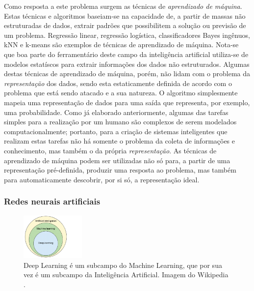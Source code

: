 \documentclass[12pt, a4paper]{article}
\begin{document}
Como resposta a este problema surgem as técnicas de \emph{aprendizado de máquina}. Estas técnicas e algoritmos
baseiam-se na capacidade de, a partir de massas não estruturadas de dados, extrair padrões que
possibilitem a solução ou previsão de um problema.
Regressão linear, regressão logística, classificadores Bayes ingênuos, 
kNN e k-means são exemplos de técnicas de aprendizado de máquina.
Nota-se que boa parte do ferramentário deste campo da inteligência artificial utiliza-se de modelos estatíscos para extrair informações
dos dados não estruturados. Algumas destas técnicas de aprendizado de máquina, porém, não lidam com o problema da \emph{representação}
dos dados, sendo esta estaticamente definida de acordo com o problema que está sendo atacado e a sua natureza. O algoritmo simplesmente mapeia uma representação de dados para uma saída que representa, por exemplo, uma probabilidade.
Como já elaborado anteriormente, algumas das tarefas simples para a realização por um humano são complexos de serem modelados computacionalmente;
portanto, para a criação de sistemas inteligentes que realizam estas tarefas não há somente o problema da coleta de informações e conhecimento,
mas também o da própria \emph{representação}. 
As técnicas de aprendizado de máquina podem ser utilizadas não só para, a partir de uma representação pré-definida, produzir uma resposta ao problema, mas também para automaticamente descobrir, por si só, a representação ideal.

\subsubsection{Redes neurais artificiais}

\begin{figure}
	\begin{center}
		\includegraphics[width=0.28\textwidth]{fig/ml_venn}
	\end{center}
	\caption{
		Deep Learning é um subcampo do Machine Learning, que por sua vez é um subcampo da Inteligência Artificial.
		Imagem do Wikipedia
		\cite{wikipedia_ml}.
	}
\end{figure}
\end{document}
